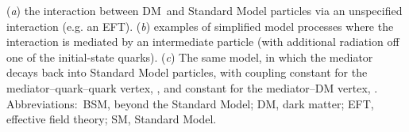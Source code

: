 (\textit{a}) the interaction between DM\ and Standard Model particles via an unspecified interaction (e.g. an EFT).
(\textit{b}) examples of simplified model processes where the interaction is mediated by an intermediate particle (with additional radiation off one of the initial-state quarks). 
(\textit{c}) The same model, in which  the mediator decays back into Standard Model particles, with coupling constant for the mediator--quark--quark vertex, \gq, and constant for the mediator--DM vertex, \gdm. 
Abbreviations:\ BSM, beyond the Standard Model; DM, dark matter; EFT, effective field theory; SM, Standard Model.

